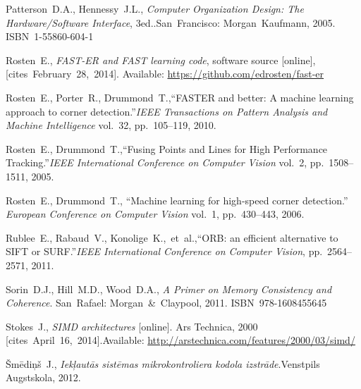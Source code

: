 {\begin{thebibliography}{99}
			Patterson~D.A., Hennessy~J.L., \linebreak[1]
			\textit{Computer Organization Design: %
				The Hardware/Software Interface}, 3\rd ed..\linebreak[1]
			San~Francisco: Morgan~Kaufmann, 2005. ISBN~1-55860-604-1
		
			Rosten~E.,
			\textit{FAST-ER and FAST learning code},
			software source [online], [cites~February~28,~2014].
			Available: \url{https://github.com/edrosten/fast-er}
		
			Rosten~E., Porter~R., Drummond~T.,\linebreak[1]
			``FASTER and better: A machine learning approach to corner detection.''\linebreak[1]
			\textit{IEEE Transactions on Pattern Analysis and Machine Intelligence} vol.~32,
			pp.~105--119, 2010.
		
			Rosten~E., Drummond~T.,\linebreak[1]
			``Fusing Points and Lines for High Performance Tracking.''\linebreak[1]
			\textit{IEEE International Conference on Computer Vision} vol.~2,
			pp.~1508--1511, 2005.
		
			Rosten~E., Drummond~T.,
			``Machine learning for high-speed corner detection.''
			\textit{European Conference on Computer Vision} vol.~1, pp.~430--443,
			2006.
		
			Rublee~E., Rabaud~V., Konolige~K.,~et~al.,\linebreak[1]
			``ORB: an efficient alternative to SIFT or SURF.''\linebreak[1]
			\textit{IEEE International Conference on Computer Vision},
			pp.~2564--2571, 2011.
		
			Sorin~D.J., Hill~M.D., Wood~D.A.,
			\textit{A Primer on Memory Consistency and Coherence}.
			San~Rafael: Morgan~\&~Claypool, 2011. ISBN~978-1608455645
		
			Stokes~J.,
			\textit{SIMD architectures} [online]. Ars Technica, 2000 %
			[cites~April~16,~2014].\linebreak[1]
			Available: \url{http://arstechnica.com/features/2000/03/simd/}
		
			Šmēdiņš~J.,
			\textit{Iekļautās sistēmas mikrokontroliera kodola izstrāde}.\linebreak[1]
			Venstpils Augstskola, 2012.
		

\end{thebibliography}}
